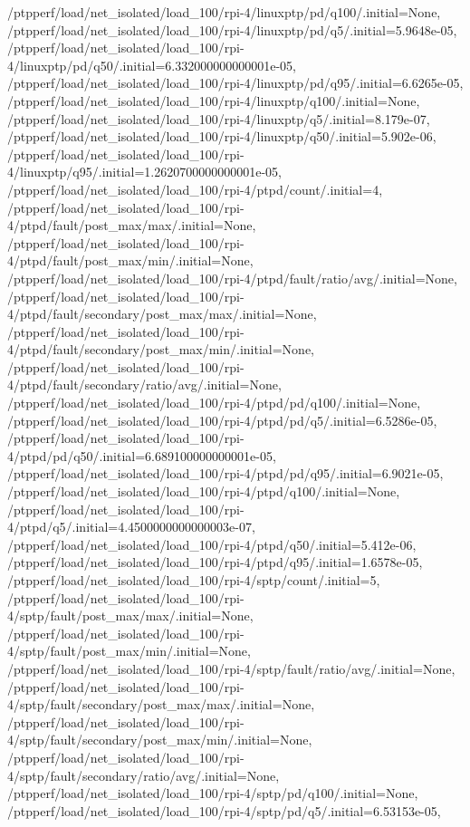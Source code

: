 {    /ptpperf/load/net_isolated/load_100/rpi-4/linuxptp/pd/q100/.initial=None,
    /ptpperf/load/net_isolated/load_100/rpi-4/linuxptp/pd/q5/.initial=5.9648e-05,
    /ptpperf/load/net_isolated/load_100/rpi-4/linuxptp/pd/q50/.initial=6.332000000000001e-05,
    /ptpperf/load/net_isolated/load_100/rpi-4/linuxptp/pd/q95/.initial=6.6265e-05,
    /ptpperf/load/net_isolated/load_100/rpi-4/linuxptp/q100/.initial=None,
    /ptpperf/load/net_isolated/load_100/rpi-4/linuxptp/q5/.initial=8.179e-07,
    /ptpperf/load/net_isolated/load_100/rpi-4/linuxptp/q50/.initial=5.902e-06,
    /ptpperf/load/net_isolated/load_100/rpi-4/linuxptp/q95/.initial=1.2620700000000001e-05,
    /ptpperf/load/net_isolated/load_100/rpi-4/ptpd/count/.initial=4,
    /ptpperf/load/net_isolated/load_100/rpi-4/ptpd/fault/post_max/max/.initial=None,
    /ptpperf/load/net_isolated/load_100/rpi-4/ptpd/fault/post_max/min/.initial=None,
    /ptpperf/load/net_isolated/load_100/rpi-4/ptpd/fault/ratio/avg/.initial=None,
    /ptpperf/load/net_isolated/load_100/rpi-4/ptpd/fault/secondary/post_max/max/.initial=None,
    /ptpperf/load/net_isolated/load_100/rpi-4/ptpd/fault/secondary/post_max/min/.initial=None,
    /ptpperf/load/net_isolated/load_100/rpi-4/ptpd/fault/secondary/ratio/avg/.initial=None,
    /ptpperf/load/net_isolated/load_100/rpi-4/ptpd/pd/q100/.initial=None,
    /ptpperf/load/net_isolated/load_100/rpi-4/ptpd/pd/q5/.initial=6.5286e-05,
    /ptpperf/load/net_isolated/load_100/rpi-4/ptpd/pd/q50/.initial=6.689100000000001e-05,
    /ptpperf/load/net_isolated/load_100/rpi-4/ptpd/pd/q95/.initial=6.9021e-05,
    /ptpperf/load/net_isolated/load_100/rpi-4/ptpd/q100/.initial=None,
    /ptpperf/load/net_isolated/load_100/rpi-4/ptpd/q5/.initial=4.4500000000000003e-07,
    /ptpperf/load/net_isolated/load_100/rpi-4/ptpd/q50/.initial=5.412e-06,
    /ptpperf/load/net_isolated/load_100/rpi-4/ptpd/q95/.initial=1.6578e-05,
    /ptpperf/load/net_isolated/load_100/rpi-4/sptp/count/.initial=5,
    /ptpperf/load/net_isolated/load_100/rpi-4/sptp/fault/post_max/max/.initial=None,
    /ptpperf/load/net_isolated/load_100/rpi-4/sptp/fault/post_max/min/.initial=None,
    /ptpperf/load/net_isolated/load_100/rpi-4/sptp/fault/ratio/avg/.initial=None,
    /ptpperf/load/net_isolated/load_100/rpi-4/sptp/fault/secondary/post_max/max/.initial=None,
    /ptpperf/load/net_isolated/load_100/rpi-4/sptp/fault/secondary/post_max/min/.initial=None,
    /ptpperf/load/net_isolated/load_100/rpi-4/sptp/fault/secondary/ratio/avg/.initial=None,
    /ptpperf/load/net_isolated/load_100/rpi-4/sptp/pd/q100/.initial=None,
    /ptpperf/load/net_isolated/load_100/rpi-4/sptp/pd/q5/.initial=6.53153e-05,
}
